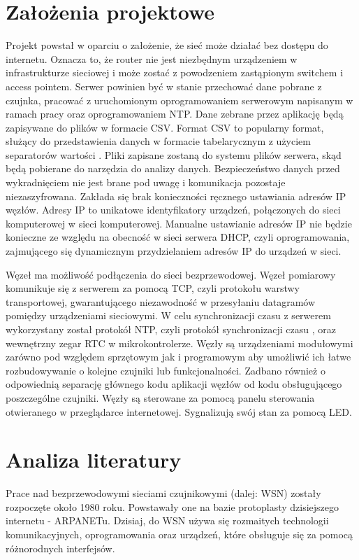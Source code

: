 \documentclass[12pt,oneside,a4paper]{book}
\theoremstyle{break}
\begin{document}
\section{Założenia projektowe}
Projekt powstał w oparciu o założenie, że sieć może działać bez dostępu do internetu.
Oznacza to, że router nie jest niezbędnym urządzeniem w infrastrukturze sieciowej i
może zostać z powodzeniem zastąpionym switchem i access pointem. Serwer
powinien być w stanie przechować dane pobrane z czujnka, pracować z 
uruchomionym oprogramowaniem serwerowym napisanym w ramach pracy oraz 
oprogramowaniem NTP. Dane zebrane przez aplikację będą zapisywane 
do plików w formacie CSV. Format CSV to popularny format,
służący do przedstawienia danych w formacie tabelarycznym z użyciem
separatorów wartości \cite{csv-definition}.
Pliki zapisane zostaną do systemu plików serwera, skąd będą 
pobierane do narzędzia do analizy danych.
Bezpieczeństwo danych przed
wykradnięciem nie jest brane pod uwagę i komunikacja pozostaje niezaszyfrowana.
Zakłada się brak konieczności ręcznego ustawiania adresów
IP węzłów. Adresy IP to unikatowe identyfikatory
urządzeń, połączonych do sieci komputerowej w sieci komputerowej.
Manualne ustawianie adresów IP nie będzie konieczne ze względu na 
obecność w sieci serwera DHCP, czyli oprogramowania, zajmującego się
dynamicznym przydzielaniem adresów IP do urządzeń w sieci. 
\par Węzeł ma możliwość podłączenia do sieci bezprzewodowej. 
Węzeł pomiarowy
komunikuje się z serwerem za pomocą TCP, czyli protokołu warstwy 
transportowej, gwarantującego niezawodność w przesyłaniu datagramów
pomiędzy urządzeniami sieciowymi.
W celu synchronizacji
czasu z serwerem wykorzystany został protokół NTP, czyli
protokół synchronizacji czasu \cite{wikipedia-ntp}, oraz wewnętrzny zegar RTC w
mikrokontrolerze.
Węzły są urządzeniami modułowymi zarówno pod względem sprzętowym jak i programowym aby umożliwić
ich łatwe rozbudowywanie o kolejne czujniki lub funkcjonalności. Zadbano również o odpowiednią
separację głównego kodu aplikacji węzłów od kodu obsługującego poszczególne czujniki. 
Węzły są sterowane za pomocą panelu sterowania
otwieranego w przeglądarce internetowej.
Sygnalizują swój stan za pomocą LED.

\section{Analiza literatury}
Prace nad bezprzewodowymi sieciami czujnikowymi (dalej: WSN)
zostały rozpoczęte około 1980 roku. Powstawały one na bazie 
protoplasty dzisiejszego internetu - ARPANETu. \cite{sensor-networks-evolution}
Dzisiaj, do WSN używa się rozmaitych technologii komunikacyjnych, 
oprogramowania oraz urządzeń, które obsługuje się za pomocą 
różnorodnych interfejsów. 
\end{document}

